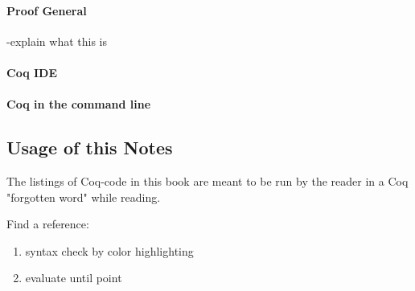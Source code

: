 \paragraph{Proof General}
-explain what this is


\paragraph{Coq IDE}

\paragraph{Coq in the command line}




\subsection{Usage of this Notes}


The listings of Coq-code in this book are meant to be run by the reader in a Coq "forgotten word" while reading.

Find a reference:
\begin{enumerate}
\item syntax check by color highlighting
\item evaluate until point
\end{enumerate}





